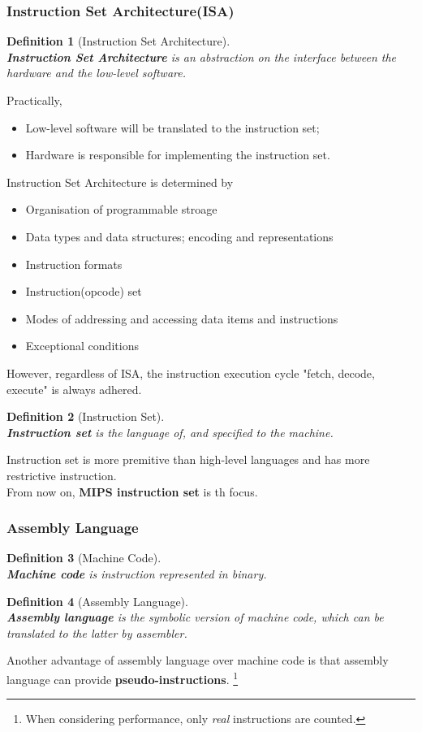 \documentclass[12pt]{article}
\newtheorem{definition}{Definition}[section]
\theoremstyle{definition}
\begin{document}
\subsubsection{Instruction Set Architecture(ISA)}
\begin{definition}[Instruction Set Architecture]
\hfill\\\normalfont \textbf{Instruction Set Architecture} is an abstraction on the interface between the \textit{hardware} and the \textit{low-level software}.
\end{definition}
Practically, 
\begin{itemize}
  \item Low-level software will be translated to the instruction set;
  \item Hardware is responsible for implementing the instruction set.
\end{itemize}
Instruction Set Architecture is determined by
\begin{itemize}
  \item Organisation of programmable stroage
  \item Data types and data structures; encoding and representations
  \item Instruction formats
  \item Instruction(opcode) set
  \item Modes of addressing and accessing data items and instructions
  \item Exceptional conditions
\end{itemize}
However, regardless of ISA, the instruction execution cycle "fetch, decode, execute" is always adhered.
\begin{definition}[Instruction Set]
\hfill\\\normalfont \textbf{Instruction set} is the language of, and specified to the machine.\end{definition}
Instruction set is more premitive than high-level languages and has more restrictive instruction.\\From now on, \textbf{MIPS instruction set} is th focus.
\subsubsection{Assembly Language}
\begin{definition}[Machine Code]\hfill\\\normalfont \textbf{Machine code} is instruction represented in binary.\end{definition}
\begin{definition}[Assembly Language]\hfill\\\normalfont \textbf{Assembly language} is the symbolic version of machine code, which can be translated to the latter by \textit{assembler}.
\end{definition}
Another advantage of assembly language over machine code is that assembly language can provide \textbf{pseudo-instructions}. \footnote{When considering performance, only \textit{real} instructions are counted.}
\end{document}
